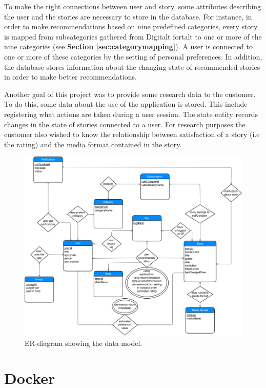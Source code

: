 To make the right connections between user and story, some attributes describing the user and the stories are necessary to store in the database. For instance, in order to make recommendations based on nine predefined categories, every story is mapped from subcategories gathered from Digitalt fortalt to one or more of the nine categories (see \textbf{Section \ref{sec:categorymapping}}). A user is connected to one or more of these categories by the setting of personal preferences. In addition, the database stores information about the changing state of recommended stories in order to make better recommendations. \newline

Another goal of this project was to provide some research data to the customer. To do this, some data about the use of the application is stored. This include registering what actions are taken during a user session. The state entity records changes in the state of stories connected to a user. For research purposes the customer also wished to know the relationship between satisfaction of a story (i.e the rating) and the media format contained in the story.

\begin{figure}[h!]
	\centering
	\includegraphics[width=\textwidth]{fig/er_diagram}
	\caption{ER-diagram showing the data model.}
	\label{Fig:er_diagram}
\end{figure}


\section{Docker}
\label{subsec:docker}

